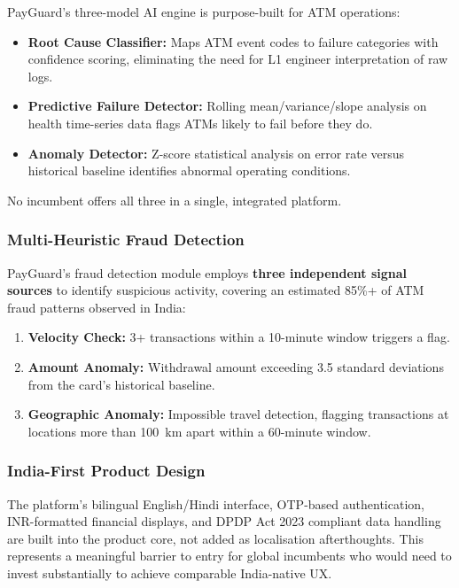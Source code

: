\documentclass[12pt,a4paper]{article}
\begin{document}
PayGuard's three-model AI engine is purpose-built for ATM operations:
\begin{itemize}
  \item \textbf{Root Cause Classifier:} Maps ATM event codes to failure categories with confidence
        scoring, eliminating the need for L1 engineer interpretation of raw logs.
  \item \textbf{Predictive Failure Detector:} Rolling mean/variance/slope analysis on health
        time-series data flags ATMs likely to fail before they do.
  \item \textbf{Anomaly Detector:} Z-score statistical analysis on error rate versus historical
        baseline identifies abnormal operating conditions.
\end{itemize}
No incumbent offers all three in a single, integrated platform.

\subsubsection{Multi-Heuristic Fraud Detection}

PayGuard's fraud detection module employs \textbf{three independent signal sources} to identify
suspicious activity, covering an estimated 85\%+ of ATM fraud patterns observed in India:
\begin{enumerate}
  \item \textbf{Velocity Check:} 3+ transactions within a 10-minute window triggers a flag.
  \item \textbf{Amount Anomaly:} Withdrawal amount exceeding 3.5 standard deviations from the
        card's historical baseline.
  \item \textbf{Geographic Anomaly:} Impossible travel detection, flagging transactions at
        locations more than 100~km apart within a 60-minute window.
\end{enumerate}

\subsubsection{India-First Product Design}

The platform's bilingual English/Hindi interface, OTP-based authentication, INR-formatted
financial displays, and DPDP Act 2023 compliant data handling are built into the product core,
not added as localisation afterthoughts. This represents a meaningful barrier to entry for global
incumbents who would need to invest substantially to achieve comparable India-native UX.
\end{document}
